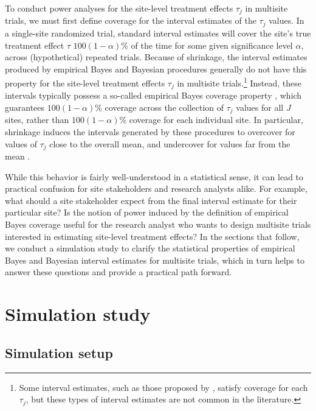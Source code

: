 \documentclass[]{article}
\begin{document}
To conduct power analyses for the site-level treatment effects $\tau_j$ in multisite trials, we must first define coverage for the interval estimates of the $\tau_j$ values.
In a single-site randomized trial, standard interval estimates will cover the site's true treatment effect $\tau$ $100(1-\alpha)$\% of the time for some given significance level $\alpha$, across (hypothetical) repeated trials.
Because of shrinkage, the interval estimates produced by empirical Bayes and Bayesian procedures generally do not have this property for the site-level treatment effects $\tau_j$ in multisite trials.\footnote{Some interval estimates, such as those proposed by \citet{yu2018adaptive}, satisfy coverage for each $\tau_j$, but these types of interval estimates are not common in the literature.}
Instead, these intervals typically possess a so-called empirical Bayes coverage property \citep{morris1983parametric}, which guarantees $100(1-\alpha)$\% coverage across the collection of $\tau_j$ values for all $J$ sites, rather than $100(1-\alpha)$\% coverage for each individual site.
In particular, shrinkage induces the intervals generated by these procedures to overcover for values of $\tau_j$ close to the overall mean, and undercover for values far from the mean \citep{snijders2011multilevel}.

While this behavior is fairly well-understood in a statistical sense, it can lead to practical confusion for site stakeholders and research analysts alike.
For example, what should a site stakeholder expect from the final interval estimate for their particular site?
Is the notion of power induced by the definition of empirical Bayes coverage useful for the research analyst who wants to design multisite trials interested in estimating site-level treatment effects?
In the sections that follow, we conduct a simulation study to clarify the statistical properties of empirical Bayes and Bayesian interval estimates for multisite trials, which in turn helps to answer these questions and provide a practical path forward.


\section{Simulation study}

\subsection{Simulation setup}
\end{document}

